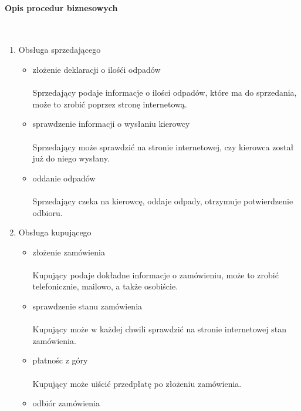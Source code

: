
\paragraph{Opis procedur biznesowych} \ \\
\begin{enumerate}
	\item Obsługa sprzedającego
		\begin{itemize}
		\item złożenie deklaracji o ilośći odpadów 
		\paragraph{} Sprzedający podaje informacje o ilości odpadów, które ma do sprzedania, może to zrobić poprzez stronę internetową.
		\item sprawdzenie informacji o wysłaniu kierowcy 
		\paragraph{}  Sprzedający może sprawdzić na stronie internetowej, czy kierowca został już do niego wysłany.
		\item oddanie odpadów 
		\paragraph{} Sprzedający czeka na kierowcę, oddaje odpady, otrzymuje potwierdzenie odbioru.
		\end{itemize}
	\item Obsługa kupującego
		\begin{itemize}
		\item złożenie zamówienia 
		\paragraph{} Kupujący podaje dokładne informacje o zamówieniu, może to zrobić telefonicznie, mailowo, a także osobiście.
		\item sprawdzenie stanu zamówienia 
		\paragraph{} Kupujący może w każdej chwili sprawdzić na stronie internetowej stan zamówienia.
		\item płatnośc z góry 
		\paragraph{} Kupujący może uiścić przedpłatę po złożeniu zamówienia.
		\item odbiór zamówienia 

\end{itemize}
\end{enumerate}
